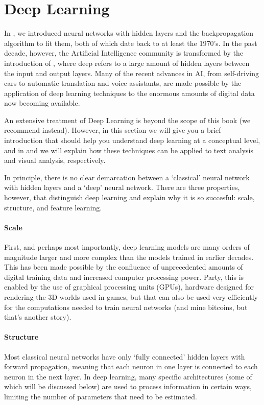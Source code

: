 \section{Deep Learning}
\label{sec:deeplearning}

In , we introduced neural networks with hidden layers and the backpropagation algorithm to fit them,
both of which date back to at least the 1970's.
In the past decade, however, the Artificial Intelligence community is transformed by the introduction of ,
where deep refers to a large amount of hidden layers between the input and output layers.
Many of the recent advances in AI, from self-driving cars to automatic translation and voice assistants,
are made possible by the application of deep learning techniques to the enormous amounts of digital data now becoming available. 

An extensive treatment of Deep Learning is beyond the scope of this book (we recommend \cite{geron2019hands} instead).
However, in this section we will give you a brief introduction that should help you understand deep learning at a conceptual level,
and in  and  we will explain how these techniques can be applied to text analysis and visual analysis, respectively. 

In principle, there is no clear demarcation between a `classical' neural network with hidden layers and a `deep' neural network.
There are three properties, however, that distinguish deep learning and explain why it is so succesful: scale, structure, and feature learning.

\paragraph{Scale} First, and perhaps most importantly, deep learning models are many orders of magnitude larger and more complex than the models
trained in earlier decades.
This has been made possible by the confluence of unprecedented amounts of digital training data and increased computer processing power.
Party, this is enabled by the use of graphical processing units (GPUs), hardware designed for rendering the 3D worlds used in games,
but that can also be used very efficiently for the computations needed to train neural networks (and mine bitcoins, but that's another story).

\paragraph{Structure} Most classical neural networks have only `fully connected' hidden layers with forward propagation,
meaning that each neuron in one layer is connected to each neuron in the next layer.
In deep learning, many specific architectures (some of which will be discussed below) are used to process information in certain ways,
limiting the number of parameters that need to be estimated.

